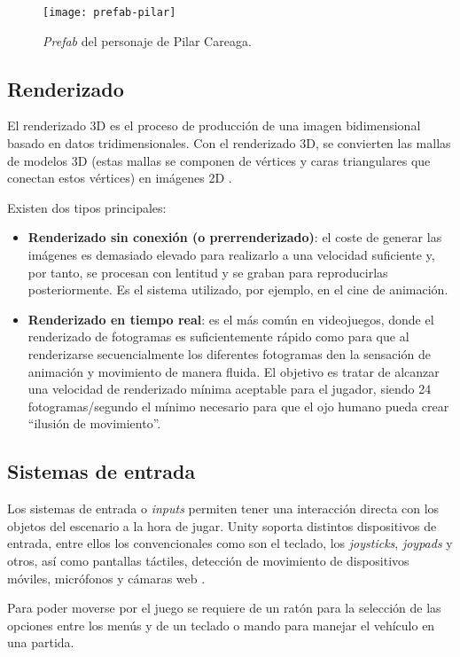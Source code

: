 \begin{figure}[h]
	\centering
	\texttt{[image: prefab-pilar]}
	\caption{\textit{Prefab} del personaje de Pilar Careaga.}
	\label{fig:prefab-pilar}
\end{figure}

\subsection{Renderizado}

El renderizado 3D es el proceso de producción de una imagen bidimensional basado en datos tridimensionales. Con el renderizado 3D, se convierten las mallas de modelos 3D (estas mallas se componen de vértices y caras triangulares que conectan estos vértices) en imágenes 2D \cite{doc:renderer}. 

Existen dos tipos principales:
\begin{itemize}
\tightlist
	\item \textbf{Renderizado sin conexión (o prerrenderizado)}: el coste de generar las imágenes es demasiado elevado para realizarlo a una velocidad suficiente y, por tanto, se procesan con lentitud y se graban para reproducirlas posteriormente. Es el sistema utilizado, por ejemplo, en el cine de animación.
	\item \textbf{Renderizado en tiempo real}: es el más común en videojuegos, donde el renderizado de fotogramas es suficientemente rápido como para que al renderizarse secuencialmente los diferentes fotogramas den la sensación de animación y movimiento de manera fluida. El objetivo es tratar de alcanzar una velocidad de renderizado mínima aceptable para el jugador, siendo 24 fotogramas/segundo el mínimo necesario para que el ojo humano pueda crear ``ilusión de movimiento''.
\end{itemize}

\subsection{Sistemas de entrada}

Los sistemas de entrada o \textit{inputs} permiten tener una interacción directa con los objetos del escenario a la hora de jugar. Unity soporta distintos dispositivos de entrada, entre ellos los convencionales como son el teclado, los \textit{joysticks}, \textit{joypads} y otros, así como pantallas táctiles, detección de movimiento de dispositivos móviles, micrófonos y cámaras web \cite{doc:input}.

Para poder moverse por el juego se requiere de un ratón para la selección de las opciones entre los menús y de un teclado o mando para manejar el vehículo en una partida.

